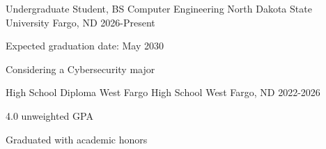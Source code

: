 

\begin{cventries}

  \cventry
    {Undergraduate Student, BS Computer Engineering} %
    {North Dakota State University} %
    {Fargo, ND} %
    {2026-Present} %
    {
      \begin{cvitems} %
        \item {Expected graduation date: May 2030}
        \item {Considering a Cybersecurity major}
      \end{cvitems}
    }

  \cventry
    {High School Diploma} %
  {West Fargo High School} %
    {West Fargo, ND} %
    {2022-2026} %
    {
      \begin{cvitems} %
        \item {4.0 unweighted GPA}
        \item {Graduated with academic honors}
      \end{cvitems}
    }

\end{cventries}
